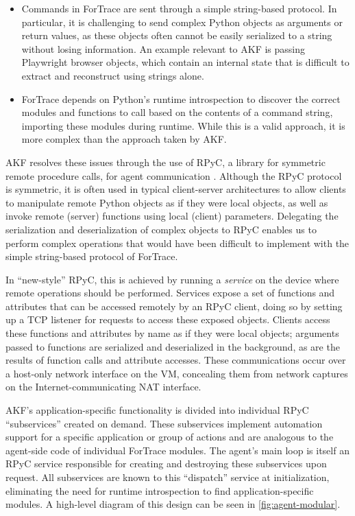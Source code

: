 \documentclass[final,5p,times,twocolumn]{elsarticle}
\begin{document}
\begin{itemize}
\item
  Commands in ForTrace are sent through a simple string-based protocol.
  In particular, it is challenging to send complex Python objects as
  arguments or return values, as these objects often cannot be easily
  serialized to a string without losing information. An example relevant
  to AKF is passing Playwright browser objects, which contain an
  internal state that is difficult to extract and reconstruct using
  strings alone.
\item
  ForTrace depends on Python's runtime introspection to discover the
  correct modules and functions to call based on the contents of a
  command string, importing these modules during runtime. While this is
  a valid approach, it is more complex than the approach taken by AKF.
\end{itemize}

AKF resolves these issues through the use of RPyC, a library for
symmetric remote procedure calls, for agent communication
\citep{TomerfilibaorgRpyc2025}. Although the RPyC protocol is
symmetric, it is often used in typical client-server architectures to
allow clients to manipulate remote Python objects as if they were local
objects, as well as invoke remote (server) functions using local
(client) parameters. Delegating the serialization and deserialization of
complex objects to RPyC enables us to perform complex operations that
would have been difficult to implement with the simple string-based
protocol of ForTrace.

In ``new-style'' RPyC, this is achieved by running a \emph{service} on
the device where remote operations should be performed. Services expose
a set of functions and attributes that can be accessed remotely by an
RPyC client, doing so by setting up a TCP listener for requests to
access these exposed objects. Clients access these functions and
attributes by name as if they were local objects; arguments passed to
functions are serialized and deserialized in the background, as are the
results of function calls and attribute accesses. These communications
occur over a host-only network interface on the VM, concealing them from
network captures on the Internet-communicating NAT interface.

AKF's application-specific functionality is divided into individual RPyC
``subservices'' created on demand. These subservices implement
automation support for a specific application or group of actions and
are analogous to the agent-side code of individual ForTrace modules. The
agent's main loop is itself an RPyC service responsible for creating and
destroying these subservices upon request. All subservices are known to
this ``dispatch'' service at initialization, eliminating the need for
runtime introspection to find application-specific modules. A high-level
diagram of this design can be seen in \autoref{fig:agent-modular}.
\end{document}
